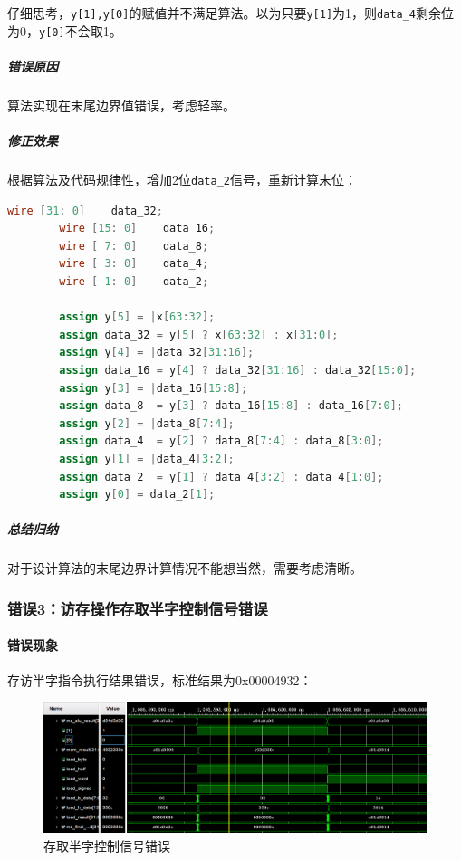 \documentclass[UTF-8,twoside,c5size]{ctexart}
\begin{document}
	仔细思考，\texttt{y[1],y[0]}的赋值并不满足算法。以为只要\texttt{y[1]}为1，则\texttt{data\_4}剩余位为0，\texttt{y[0]}不会取1。
	
	\subparagraph{错误原因}\hfill
	
	算法实现在末尾边界值错误，考虑轻率。
	
	\subparagraph{修正效果}\hfill
	
	根据算法及代码规律性，增加2位\texttt{data\_2}信号，重新计算末位：
	
	\begin{lstlisting}[language=verilog]
		wire [31: 0]    data_32;
		wire [15: 0]    data_16;
		wire [ 7: 0]    data_8;
		wire [ 3: 0]    data_4;
		wire [ 1: 0]    data_2;
		
		assign y[5] = |x[63:32];
		assign data_32 = y[5] ? x[63:32] : x[31:0];
		assign y[4] = |data_32[31:16];
		assign data_16 = y[4] ? data_32[31:16] : data_32[15:0];
		assign y[3] = |data_16[15:8];
		assign data_8  = y[3] ? data_16[15:8] : data_16[7:0];
		assign y[2] = |data_8[7:4];
		assign data_4  = y[2] ? data_8[7:4] : data_8[3:0];
		assign y[1] = |data_4[3:2];
		assign data_2  = y[1] ? data_4[3:2] : data_4[1:0];
		assign y[0] = data_2[1];
	\end{lstlisting}
	
	\subparagraph{总结归纳}\hfill
	
	对于设计算法的末尾边界计算情况不能想当然，需要考虑清晰。

	\subsubsection{错误\textbf{3：}访存操作存取半字控制信号错误}
	\paragraph{错误现象}\hfill
	
	
	存访半字指令执行结果错误，标准结果为0x00004932：
	
	\begin{figure}[h]
		\centering
		\includegraphics[width=0.85\linewidth]{figures/ldh_sth.png}
		\caption{存取半字控制信号错误}
		\label{fig:ldhsth}
	\end{figure}
	
\end{document}

